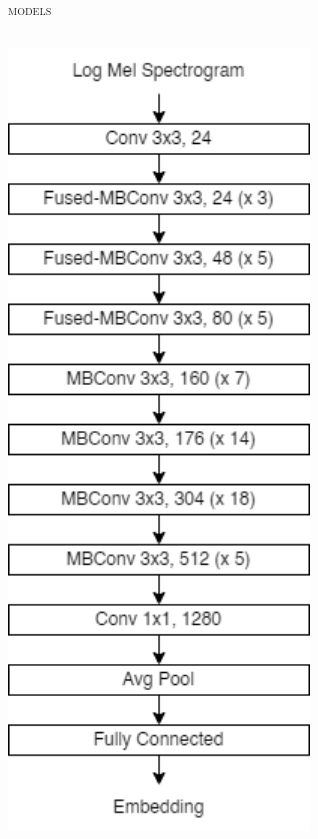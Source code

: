\documentclass[10pt,aspectratio=1610,professionalfont]{beamer}
\begin{document}
\begin{frame}{\textsc{models}}
\begin{columns}
\begin{column}{0.33\textwidth}
\begin{center}
		     		\includegraphics[width=0.6\textwidth]{img/efficientnetv2.png}
		    	\end{center}
		\end{column}
	\end{columns}
\end{frame}
\end{document}
